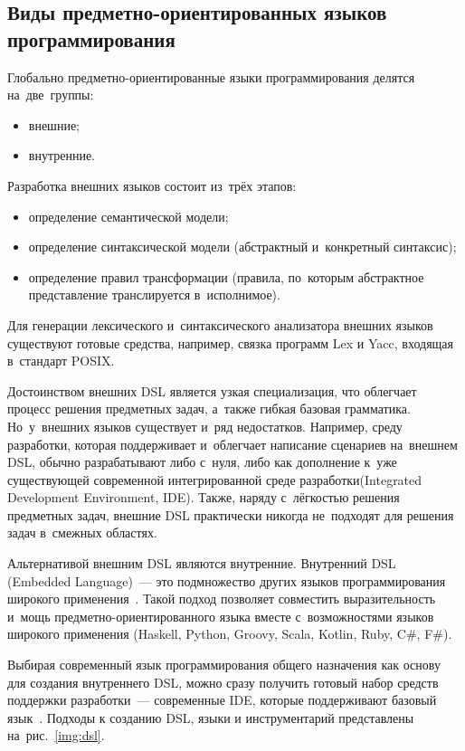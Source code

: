 \subsection{Виды предметно-ориентированных языков программирования} \label{sub122}
Глобально предметно-ориентированные языки программирования делятся на~две~группы: 
\begin{itemize} 
	\item{внешние;}
	\item{внутренние.}
\end{itemize}

Разработка внешних языков состоит из~трёх этапов:

\begin{itemize} 
	\item{определение семантической модели;}
	\item{определение синтаксической модели (абстрактный и~конкретный синтаксис);}
	\item{определение правил трансформации (правила, по~которым абстрактное представление транслируется в~исполнимое).}
\end{itemize}

Для генерации лексического и~синтаксического анализатора внешних языков существуют готовые средства, например, связка программ Lex и Yacc, входящая в~стандарт POSIX. 

Достоинством внешних DSL является узкая специализация, что облегчает процесс решения предметных задач, а~также гибкая базовая грамматика. Но~у~внешних языков существует и~ряд недостатков. Например, среду разработки, которая поддерживает и~облегчает написание сценариев на~внешнем DSL, обычно разрабатывают либо с~нуля, либо как дополнение к~уже существующей современной интегрированной среде разработки(Integrated Development Environment, IDE). Также, наряду с~лёгкостью решения предметных задач, внешние DSL практически никогда не~подходят для решения задач в~смежных областях.

Альтернативой внешним DSL являются внутренние. Внутренний DSL (Embedded Language)~--- это подмножество других языков программирования широкого применения~\cite{VanDeursen2000}. Такой подход позволяет совместить выразительность и~мощь предметно-ориентированного языка вместе с~возможностями языков широкого применения (Haskell, Python, Groovy, Scala, Kotlin, Ruby, C\#, F\#). 

Выбирая современный язык программирования общего назначения как основу для создания внутреннего DSL, можно сразу получить готовый набор средств поддержки разработки~--- современные IDE, которые поддерживают базовый язык~\cite{Botov}. Подходы к созданию DSL, языки и инструментарий представлены на~рис.~\ref{img:dsl}.

